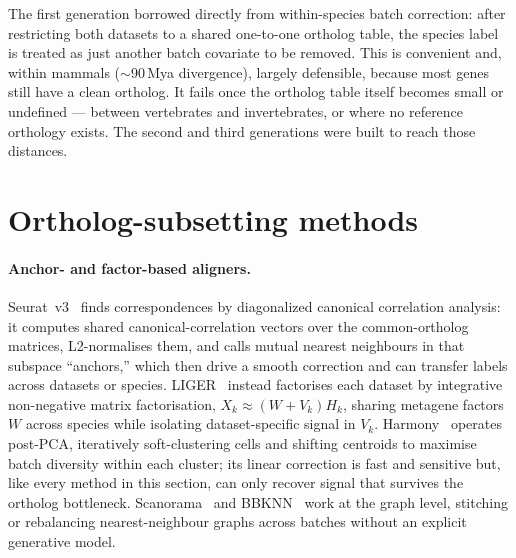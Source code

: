 \documentclass[10pt,twocolumn]{article}
\begin{document}
The first generation borrowed directly from within-species batch correction: after
restricting both datasets to a shared one-to-one ortholog table, the species label
is treated as just another batch covariate to be removed. This is convenient and,
within mammals ($\sim$90\,Mya divergence), largely defensible, because most genes
still have a clean ortholog. It fails once the ortholog table itself becomes small
or undefined --- between vertebrates and invertebrates, or where no reference
orthology exists. The second and third generations were built to reach those
distances.

\section{Ortholog-subsetting methods}
\paragraph{Anchor- and factor-based aligners.}
Seurat~v3~\cite{stuart2019} finds correspondences by diagonalized canonical
correlation analysis: it computes shared canonical-correlation vectors over the
common-ortholog matrices, L2-normalises them, and calls mutual nearest neighbours
in that subspace ``anchors,'' which then drive a smooth correction and can transfer
labels across datasets or species. LIGER~\cite{welch2019} instead factorises each
dataset by integrative non-negative matrix factorisation, $X_k \approx (W+V_k)H_k$,
sharing metagene factors $W$ across species while isolating dataset-specific signal
in $V_k$. Harmony~\cite{korsunsky2019} operates post-PCA, iteratively soft-clustering
cells and shifting centroids to maximise batch diversity within each cluster; its
linear correction is fast and sensitive but, like every method in this section,
can only recover signal that survives the ortholog bottleneck. Scanorama~\cite{hie2019}
and BBKNN~\cite{polanski2020} work at the graph level, stitching or rebalancing
nearest-neighbour graphs across batches without an explicit generative model.
\end{document}
